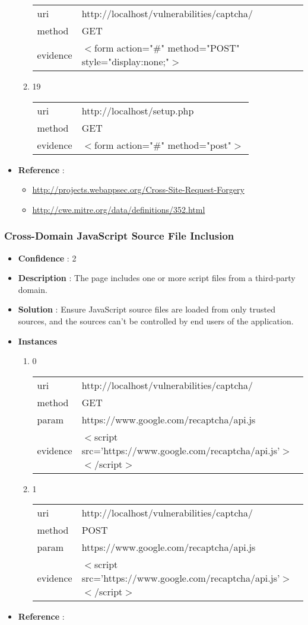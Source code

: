 \documentclass[10pt]{article}
\begin{document}
\begin{itemize}
\begin{enumerate}
\begin{tabular}{| l | p{14cm}}
uri & http://localhost/vulnerabilities/captcha/ \\
method & GET \\
evidence & $<$form action="\#" method="POST" style="display:none;"$>$ \\
\end{tabular}
\item[] 19
\begin{tabular}{| l | p{14cm}}
uri & http://localhost/setup.php \\
method & GET \\
evidence & $<$form action="\#" method="post"$>$ \\
\end{tabular}
\end{enumerate}
\item[] \textbf{Reference} : 
\begin{itemize}
\item \url{http://projects.webappsec.org/Cross-Site-Request-Forgery}
\item \url{http://cwe.mitre.org/data/definitions/352.html}
\end{itemize}
\end{itemize}
\subsubsection{Cross-Domain JavaScript Source File Inclusion}
\begin{itemize}
\item[] \textbf{Confidence} : 2
\item[] \textbf{Description} : The page includes one or more script files from a third-party domain.
\item[] \textbf{Solution} :  Ensure JavaScript source files are loaded from only trusted sources, and the sources can't be controlled by end users of the application.
\item[] \textbf{Instances}
\begin{enumerate}
\item[] 0
\begin{tabular}{| l | p{14cm}}
uri & http://localhost/vulnerabilities/captcha/ \\
method & GET \\
param & https://www.google.com/recaptcha/api.js \\
evidence & $<$script src='https://www.google.com/recaptcha/api.js'$>$$<$/script$>$ \\
\end{tabular}
\item[] 1
\begin{tabular}{| l | p{14cm}}
uri & http://localhost/vulnerabilities/captcha/ \\
method & POST \\
param & https://www.google.com/recaptcha/api.js \\
evidence & $<$script src='https://www.google.com/recaptcha/api.js'$>$$<$/script$>$ \\
\end{tabular}
\end{enumerate}
\item[] \textbf{Reference} : 
\end{itemize}
\end{document}
